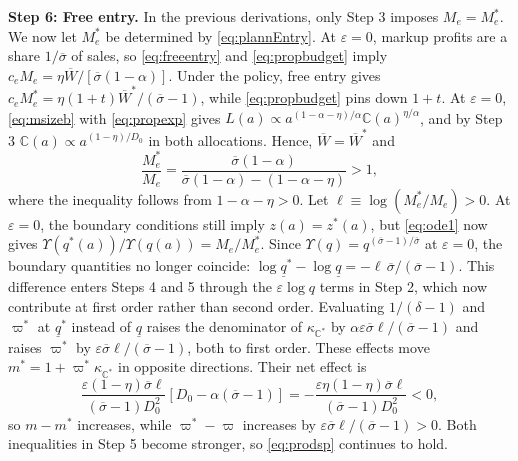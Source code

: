 \noindent \textbf{Step 6: Free entry.} In the previous derivations, only Step 3 imposes $M_e = M_e^*$. We now let $M_e^*$ be determined by \eqref{eq:plannEntry}. At $\varepsilon = 0$, markup profits are a share $1/\overline{\sigma}$ of sales, so \eqref{eq:freeentry} and \eqref{eq:propbudget} imply $c_e M_e = \eta \overline{W}/\left[\overline{\sigma}(1-\alpha)\right]$. Under the policy, free entry gives $c_e M_e^* = \eta (1+t) \overline{W}^*/(\overline{\sigma} - 1)$, while \eqref{eq:propbudget} pins down $1+t$. At $\varepsilon = 0$, \eqref{eq:msizeb} with \eqref{eq:propexp} gives $L(a) \propto a^{(1-\alpha-\eta)/\alpha}\mathbb C(a)^{\eta/\alpha}$, and by Step 3 $\mathbb C(a) \propto a^{(1-\eta)/D_0}$ in both allocations. Hence, $\overline{W} = \overline{W}^*$ and
%
\begin{equation*}
    \frac{M_e^*}{M_e} = \frac{\overline{\sigma} (1 - \alpha)}{\overline{\sigma}(1-\alpha) - (1 - \alpha - \eta)} > 1,
\end{equation*}
%
where the inequality follows from $1 - \alpha - \eta > 0$. Let $\ell \equiv \log(M_e^*/M_e) > 0$. At $\varepsilon = 0$, the boundary conditions still imply $z(a)=z^*(a)$, but \eqref{eq:ode1} now gives $\Upsilon(q^*(a))/\Upsilon(q(a)) = M_e/M_e^*$. Since $\Upsilon(q) = q^{(\overline{\sigma}-1)/\overline{\sigma}}$ at $\varepsilon = 0$, the boundary quantities no longer coincide:
$\log \underline{q}^* - \log \underline{q} = -\ell \, \overline{\sigma}/(\overline{\sigma} - 1)$. This difference enters Steps 4 and 5 through the $\varepsilon \log q$ terms in Step 2, which now contribute at first order rather than second order. Evaluating $1/(\delta - 1)$ and $\varpi^*$ at $\underline{q}^*$ instead of $\underline{q}$ raises the denominator of $\kappa_{\mathbb{C}^*}$ by $\alpha \varepsilon \overline{\sigma} \ell/(\overline{\sigma} - 1)$ and raises $\varpi^*$ by $\varepsilon \overline{\sigma} \ell/(\overline{\sigma} - 1)$, both to first order. These effects move $m^* = 1 + \varpi^* \kappa_{\mathbb{C}^*}$ in opposite directions. Their net effect is
%
\begin{equation*}
    \frac{\varepsilon (1-\eta) \overline{\sigma} \ell}{(\overline{\sigma} - 1) D_0^2} \left[D_0 - \alpha (\overline{\sigma} - 1)\right] = - \frac{\varepsilon \eta (1-\eta) \overline{\sigma} \ell}{(\overline{\sigma} - 1) D_0^2} < 0,
\end{equation*}
%
so $m - m^*$ increases, while $\varpi^* - \varpi$ increases by $\varepsilon \overline{\sigma} \ell/(\overline{\sigma} - 1) > 0$. Both inequalities in Step 5 become stronger, so \eqref{eq:prodsp} continues to hold.

